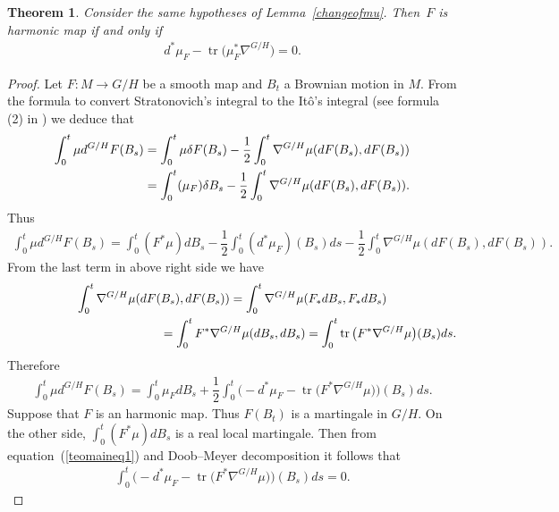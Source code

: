 \documentclass[pdftex]{sigma}
\numberwithin{equation}{section}
\newtheorem{Theorem}{Theorem}[section]
\begin{document}
\begin{Theorem}\label{mainteo}
  Consider the same hypotheses of Lemma~{\rm \ref{changeofmu}}. Then~$F$ is harmonic map if and only if
  \begin{gather*}%
    d^{*}\mu_{F}  - \operatorname{tr}\big(\mu_{F}^* \nabla^{G/H}\big) = 0.
  \end{gather*}
\end{Theorem}

\begin{proof}
  Let $F\colon M \rightarrow G/H$ be a smooth map and $B_{t}$ a Brownian motion in $M$. From the formula to convert Stratonovich's integral to the It\^o's integral (see formula (2) in \cite{Stelmastchuk}) we deduce that
  \begin{gather*}
    \int_0^t \mu d^{G/H}F(B_{s})
      =  \int_0^t \mu \delta F(B_{s}) -\dfrac{1}{2} \int_0^t \nabla^{G/H}\mu(dF(B_s),dF(B_s))\\
\hphantom{\int_0^t \mu d^{G/H}F(B_{s})}{}  =  \int_0^t (\mu_{F}) \delta B_{s} - \dfrac{1}{2}\int_0^t \nabla^{G/H}\mu(dF(B_s),dF(B_s)).
  \end{gather*}
  Thus
  \begin{gather*}
    \int_0^t  \mu d^{G/H}F(B_{s})  =  \int_0^t  (F^{*}\mu) dB_{s}  -  \dfrac{1}{2}\int_0^t
    (d^{*}\mu_{F})(B_{s})ds - \dfrac{1}{2} \int_0^t  \nabla^{G/H}\mu(dF(B_s),dF(B_s)).
  \end{gather*}
  From the last term in above right side we have
  \begin{gather*}
    \int_0^t \nabla^{G/H}\mu(dF(B_s),dF(B_s))   =   \int_0^t \nabla^{G/H}\mu(F_{*}dB_s,F_{*}dB_s)\\
\hphantom{\int_0^t \nabla^{G/H}\mu(dF(B_s),dF(B_s))}{}
 =   \int_0^t  F^{*} \nabla^{G/H}\mu(dB_s,dB_s)   =  \int_0^t  \operatorname{tr}\big(F^{*}
    \nabla^{G/H}\mu\big)(B_{s})ds .
  \end{gather*}
  Therefore
  \begin{gather}\label{teomaineq1}
    \int_0^t \mu d^{G/H}F(B_{s}) = \int_0^t \mu_{F} dB_{s} + \dfrac{1}{2}\int_0^t\big({-}d^{*}\mu_{F} - \operatorname{tr}\big(F^{*} \nabla^{G/H}\mu\big)\big)(B_{s}) ds.
  \end{gather}
  Suppose that $F$ is an harmonic map. Thus $F(B_{t})$ is a martingale in $G/H$. On the other side, $\int_0^t (F^{*}\mu) dB_{s}$ is a real local martingale. Then from equation~(\ref{teomaineq1}) and Doob--Meyer decomposition it follows that
  \begin{gather*}%
    \int_0^t \big({-}d^{*}\mu_{F} - \operatorname{tr}\big(F^{*} \nabla^{G/H}\mu\big)\big)(B_{s}) ds = 0.

\end{gather*}
\end{proof}
\end{document}
